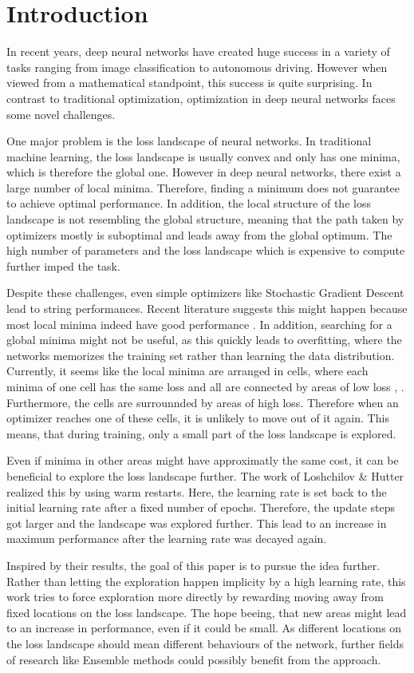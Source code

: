\chapter{Introduction}
In recent years, deep neural networks have created huge success in a variety of
tasks ranging from image classification to autonomous driving. However when
viewed from a mathematical standpoint, this success is quite surprising. In
contrast to traditional optimization, optimization in deep neural networks faces
some novel challenges.

One major problem is the loss landscape of neural networks. In traditional
machine learning, the loss landscape is usually convex and only has one minima,
which is therefore the global one. However in deep neural networks, there exist
a large number of local minima. Therefore, finding a minimum does not guarantee
to achieve optimal performance. In addition, the local structure of the loss
landscape is not resembling the global structure, meaning that the path taken by
optimizers mostly is suboptimal and leads away from the global optimum. The high
number of parameters and the loss landscape which is expensive to compute
further imped the task.

Despite these challenges, even simple optimizers like Stochastic Gradient
Descent lead to string performances. Recent literature suggests this might
happen because most local minima indeed have good performance
\cite{choromanska2015loss}. In addition, searching for a global minima might not
be useful, as this quickly leads to overfitting, where the networks memorizes
the training set rather than learning the data distribution. Currently, it seems
like the local minima are arranged in cells, where each minima of one cell has
the same loss and all are connected by areas of low loss \cite{he2020piecewise},
\cite{draxler2018essentially}. Furthermore, the cells are surrounnded by areas
of high loss. Therefore when an optimizer reaches one of these cells, it is
unlikely to move out of it again. This means, that during training, only a small
part of the loss landscape is explored.

Even if minima in other areas might have approximatly the same cost, it can be
beneficial to explore the loss landscape further. The work of Loshchilov \&
Hutter \cite{loshchilov2016sgdr} realized this by using warm restarts. Here, the
learning rate is set back to the initial learning rate after a fixed number of
epochs. Therefore, the update steps got larger and the landscape was explored
further. This lead to an increase in maximum performance after the learning rate
was decayed again.

Inspired by their results, the goal of this paper is to pursue the idea further.
Rather than letting the exploration happen implicity by a high learning rate,
this work tries to force exploration more directly by rewarding moving away from
fixed locations on the loss landscape. The hope beeing, that new areas might
lead to an increase in performance, even if it could be small. As different
locations on the loss landscape should mean different behaviours of the network,
further fields of research like Ensemble methods could possibly benefit from the
approach.

